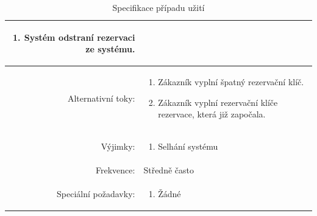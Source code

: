 \documentclass[a4paper,10pt]{article}
\begin{document}
\begin{table}[ht!]
{\begin{tabular}{| r | p{12cm} |}
\begin{minipage}[t]{0.75\textwidth}
\begin{enumerate}[nosep,after=\strut]
            \item Systém odstraní rezervaci ze systému. 
    	\end{enumerate}
  	\end{minipage} \\
    \hline
    Alternativní toky: & 
    \begin{minipage}[t]{0.75\textwidth}
    	\begin{enumerate}[nosep,after=\strut]
            \item Zákazník vyplní špatný rezervační klíč.
            \item Zákazník vyplní rezervační klíče rezervace, která již započala.
    	\end{enumerate}
  	\end{minipage} \\
    \hline
    Výjimky: & 
    \begin{minipage}[t]{0.75\textwidth}
    	\begin{enumerate}[nosep,after=\strut]
    		\item Selhání systému
    	\end{enumerate}
  	\end{minipage} \\
    \hline
    Frekvence: & Středně často \\
    \hline
    Speciální požadavky: & 
    \begin{minipage}[t]{0.75\textwidth}
    	\begin{enumerate}[nosep,after=\strut]
    		\item Žádné
    	\end{enumerate}
  	\end{minipage} \\
    \hline

\end{tabular}}
\caption{Specifikace případu užití }
\label{table:1}
\end{table}
\end{document}
